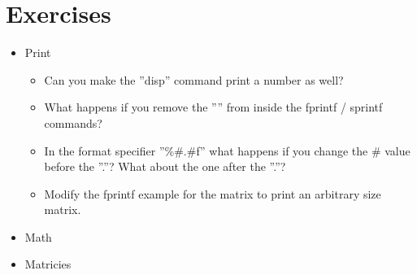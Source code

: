\section{Exercises}
\begin{itemize}
 \item Print
 \begin{itemize}
  \item Can you make the ''disp'' command print a number as well?
  \item What happens if you remove the ''\verbatim{\n}'' from inside the fprintf / sprintf commands?
  \item In the format specifier ''\%\#.\#f'' what happens if you change the \# value before the ''.''? What about the one after the ''.''?
  \item Modify the fprintf example for the matrix to print an arbitrary size matrix.
 \end{itemize}
 \item Math
 \item Matricies
\end{itemize}
